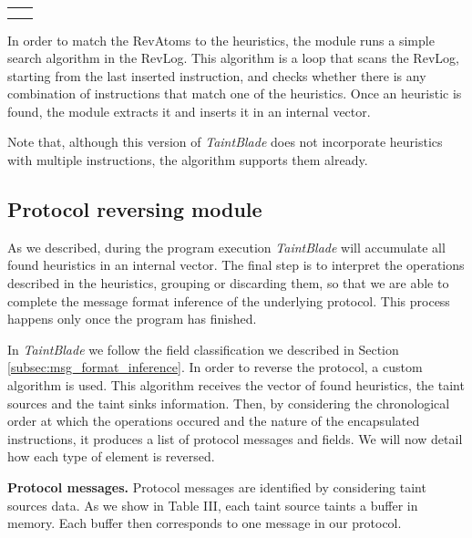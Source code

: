 \documentclass[conference]{IEEEtran}
\begin{document}
\begin{table}[htbp]
\begin{center}
\begin{tabular}{|>{\centering\arraybackslash}p{1.5cm}|>{\centering\arraybackslash}p{6.3cm}|}
                               &                                                                       \\
                               &                                                                       \\
            \hline
        \end{tabular}
        \label{tab1}
    \end{center}
    \label{table:implemented_heuristics}
\end{table}

In order to match the RevAtoms to the heuristics, the module runs a simple search
algorithm in the RevLog. This algorithm is a loop that scans the RevLog,
starting from the last inserted instruction, and checks whether there is any
combination of instructions that match one of the heuristics. Once an heuristic
is found, the module extracts it and inserts it in an internal vector.

Note that, although this version of \textit{TaintBlade} does not incorporate
heuristics with multiple instructions, the algorithm supports them already.

\subsection{Protocol reversing module} \label{subsec:prot_rev_module}
As we described, during the program execution \textit{TaintBlade} will
accumulate all found heuristics in an internal vector. The final step is to
interpret the operations described in the heuristics, grouping or discarding
them, so that we are able to complete the message format inference of the
underlying protocol. This process happens only once the program has finished.

In \textit{TaintBlade} we follow the field classification we described in Section
\ref{subsec:msg_format_inference}. In order to reverse the protocol, a custom algorithm 
is used. This algorithm receives the vector of found heuristics,
the taint sources and the taint sinks information. Then,
by considering the chronological order at which the
operations occured and the nature of the encapsulated
instructions, it produces a list of protocol messages and fields.
We will now detail how each type of element is reversed.

\textbf{Protocol messages.} Protocol messages are identified by
considering taint sources data. As we show in Table III,
each taint source taints a buffer in memory. Each buffer then
corresponds to one message in our protocol.
\end{document}
